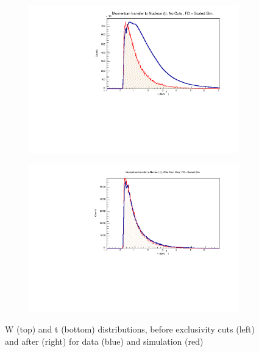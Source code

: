 \begin{figure}[!htb]
\begin{subfigure}{.5\textwidth}
            \end{subfigure}
            \begin{subfigure}{.5\textwidth}
                \centering
                \includegraphics[width=1\textwidth]{figures/Simulation/kinematics_advanced/hist_kinematic_t_nocut_fd_Double.pdf}
            \end{subfigure}%
            \begin{subfigure}{.5\textwidth}
                \centering
                \includegraphics[width=1\textwidth]{figures/Simulation/kinematics_advanced/hist_kinematic_t_excut_fd_Double.pdf}
            \end{subfigure}
            \caption[short]{W (top) and t (bottom) distributions, before exclusivity cuts (left) and after (right) for data (blue) and simulation (red)}
        \end{figure} 
        
